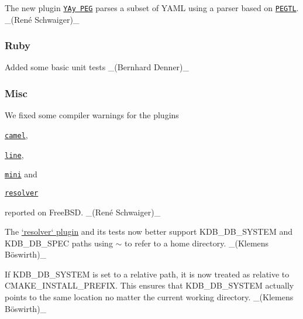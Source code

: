 \begin{DoxyItemize}
\item The new plugin \href{https://www.libelektra.org/plugins/yaypeg}{\tt Y\+Ay P\+EG} parses a subset of Y\+A\+ML using a parser based on \href{https://github.com/taocpp/PEGTL}{\tt P\+E\+G\+TL}. \+\_\+(René Schwaiger)\+\_\+
\end{DoxyItemize}

\subsubsection*{Ruby}


\begin{DoxyItemize}
\item Added some basic unit tests \+\_\+(\+Bernhard Denner)\+\_\+
\end{DoxyItemize}

\subsubsection*{Misc}


\begin{DoxyItemize}
\item We fixed some compiler warnings for the plugins
\begin{DoxyItemize}
\item \href{https://www.libelektra.org/plugins/camel}{\tt {\ttfamily camel}},
\item \href{https://www.libelektra.org/plugins/line}{\tt {\ttfamily line}},
\item \href{https://www.libelektra.org/plugins/mini}{\tt {\ttfamily mini}} and
\item \href{https://www.libelektra.org/plugins/resolver}{\tt {\ttfamily resolver}}
\end{DoxyItemize}

reported on Free\+B\+SD. \+\_\+(René Schwaiger)\+\_\+
\item The \hyperlink{md_src_plugins_resolver_README_src_plugins_resolver_README_md}{`resolver` plugin} and its tests now better support {\ttfamily K\+D\+B\+\_\+\+D\+B\+\_\+\+S\+Y\+S\+T\+EM} and {\ttfamily K\+D\+B\+\_\+\+D\+B\+\_\+\+S\+P\+EC} paths using {\ttfamily $\sim$} to refer to a home directory. \+\_\+(Klemens Böswirth)\+\_\+
\item If {\ttfamily K\+D\+B\+\_\+\+D\+B\+\_\+\+S\+Y\+S\+T\+EM} is set to a relative path, it is now treated as relative to {\ttfamily C\+M\+A\+K\+E\+\_\+\+I\+N\+S\+T\+A\+L\+L\+\_\+\+P\+R\+E\+F\+IX}. This ensures that {\ttfamily K\+D\+B\+\_\+\+D\+B\+\_\+\+S\+Y\+S\+T\+EM} actually points to the same location no matter the current working directory. \+\_\+(Klemens Böswirth)\+\_\+
\end{DoxyItemize}

